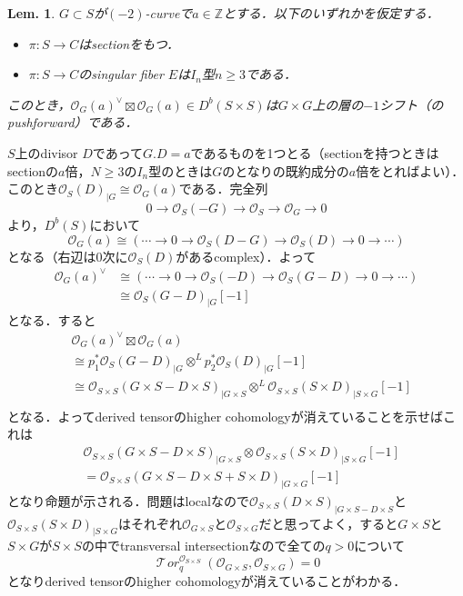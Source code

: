 \documentclass[uplatex,a4paper,11pt,dvipdfmx]{jsarticle}
\makeatletter
\theoremstyle{mystyle} %
\newtheorem{lemma}[theorem]{Lem.}
\renewenvironment{proof}[1][\proofname]{\par
 \pushQED{\qed}%
 \normalfont \topsep6\p@\@plus6\p@\relax
 \trivlist
 \item[\hskip\labelsep
 \itshape
 {\bf\underline{#1}}]\ignorespaces
}{%
 \popQED\endtrivlist\@endpefalse
}
\newcommand{\Torsheaf}{\mathop{\mathcal{T}\! \mathit{or}}\nolimits}
\makeatother
\begin{document}
\begin{lemma}\label{boxtimes_is_a_sheaf}
	$G \subset S$が$(-2)$-curveで$a \in \mathbb{Z}$とする．以下のいずれかを仮定する．
	\begin{itemize}
		\item $\pi \colon S \to C$はsectionをもつ．
		\item $\pi \colon S \to C$のsingular fiber $E$は$I_n$型$n \geq 3$である．
	\end{itemize}
	このとき，$\mathcal{O}_G(a)^\vee \boxtimes \mathcal{O}_G(a) \in D^b(S\times S)$は$G\times G$上の層の$-1$シフト（のpushforward）である．
\end{lemma}
\begin{proof}
	$S$上のdivisor $D$であって$G.D = a$であるものを1つとる（sectionを持つときはsectionの$a$倍，$N \geq 3$の$I_n$型のときは$G$のとなりの既約成分の$a$倍をとればよい）．このとき$\mathcal{O}_S(D)_{|G} \cong \mathcal{O}_G(a)$である．完全列$$0 \to \mathcal{O}_S(-G) \to \mathcal{O}_S \to \mathcal{O}_G \to 0$$より，$D^b(S)$において$$\mathcal{O}_G(a) \cong (\cdots \to 0 \to \mathcal{O}_S(D-G) \to \mathcal{O}_S(D) \to 0 \to \cdots)$$となる（右辺は$0$次に$\mathcal{O}_S(D)$があるcomplex）．よって
	\begin{align*}
		\mathcal{O}_G(a)^\vee & \cong (\cdots \to 0 \to \mathcal{O}_S(-D) \to \mathcal{O}_S(G-D) \to 0 \to \cdots) \\
		                      & \cong \mathcal{O}_S(G-D)_{|G}[-1]
	\end{align*}
	となる．すると
	\begin{align*}
		 & \mathcal{O}_G(a)^\vee \boxtimes \mathcal{O}_G(a)                                                                                 \\
		 & \cong p_1^*\mathcal{O}_S(G-D)_{|G} \otimes^L p_2^*\mathcal{O}_S(D)_{|G}[-1]                                                      \\
		 & \cong \mathcal{O}_{S\times S}(G\times S - D\times S)_{|G\times S} \otimes^L \mathcal{O}_{S\times S}(S \times D)_{|S\times G}[-1] \\
	\end{align*}
	となる．よってderived tensorのhigher cohomologyが消えていることを示せばこれは
	\begin{align*}
		 & \mathcal{O}_{S\times S}(G\times S - D\times S)_{|G\times S} \otimes \mathcal{O}_{S\times S}(S \times D)_{|S\times G}[-1] \\
		 & = \mathcal{O}_{S\times S}(G\times S - D\times S+S \times D)_{|G\times G}[-1]
	\end{align*}
	となり命題が示される．問題はlocalなので$\mathcal{O}_{S\times S}(D\times S)_{|G\times S - D\times S}$と$\mathcal{O}_{S\times S}(S \times D)_{|S\times G}$はそれぞれ$\mathcal{O}_{G\times S}$と$\mathcal{O}_{S\times G}$だと思ってよく，すると$G \times S$と$S \times G$が$S \times S$の中でtransversal intersectionなので全ての$q>0$について$$\Torsheaf_q^{\mathcal{O}_{S\times S}}(\mathcal{O}_{G\times S}, \mathcal{O}_{S\times G})=0$$となりderived tensorのhigher cohomologyが消えていることがわかる．
\end{proof}
\end{document}
